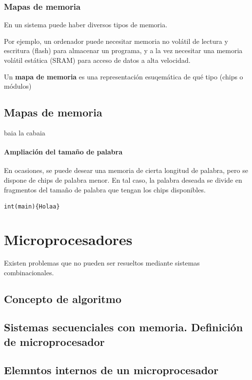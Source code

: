 \documentclass[a4paper]{book}
\begin{document}
\subsection{Mapas de memoria}

En un sistema puede haber diversos tipos de memoria.

Por ejemplo, un ordenador puede necesitar memoria no volátil de lectura y escritura (flash) para almacenar un programa, y a la vez necesitar una memoria volátil estática (SRAM) para acceso de datos a alta velocidad.

Un \textbf{mapa de memoria} es una representación esuqemática de qué tipo (chips o módulos)

\section{Mapas de memoria}

baia la cabaia

\subsubsection{Ampliación del tamaño de palabra}

En ocasiones, se puede desear una memoria de cierta longitud de palabra, pero se dispone de chips de palabra menor. En tal caso, la palabra deseada se divide en fragmentos del tamaño de palabra que tengan los chips disponibles.

\verb|int(main){Holaa}|

\chapter{Microprocesadores}

Existen problemas que no pueden ser resueltos mediante sistemas combinacionales.
\section{Concepto de algoritmo}

\section{Sistemas secuenciales con memoria. Definición de microprocesador}

\section{Elemntos internos de un microprocesador}
\end{document}
